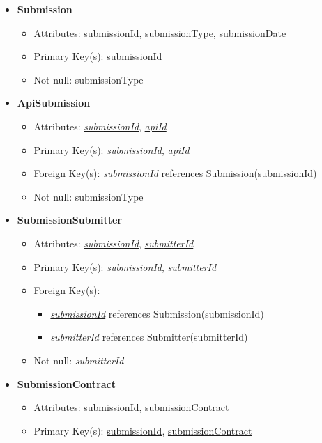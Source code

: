 \begin{itemize}
        \item \textbf{Submission}
        \begin{itemize}
            \item Attributes: \underline{submissionId}, submissionType, submissionDate
            \item Primary Key(s): \underline{submissionId}            
            \item Not null: submissionType
        \end{itemize}

        \item \textbf{ApiSubmission}
        \begin{itemize}
            \item Attributes: \underline{\textit{submissionId}}, \underline{\textit{apiId}}
            \item Primary Key(s): \underline{\textit{submissionId}}, \underline{\textit{apiId}}
            \item Foreign Key(s): \underline{\textit{submissionId}} references Submission(submissionId)
            \item Not null: submissionType
        \end{itemize}

        \item \textbf{SubmissionSubmitter}
        \begin{itemize}
            \item Attributes: \underline{\textit{submissionId}}, \underline{\textit{submitterId}}
            \item Primary Key(s): \underline{\textit{submissionId}}, \underline{\textit{submitterId}}
            \item Foreign Key(s): 
            \begin{itemize}
                \item \underline{\textit{submissionId}} references Submission(submissionId)
                \item \textit{submitterId} references Submitter(submitterId)
            \end{itemize}
            \item Not null: \textit{submitterId}
        \end{itemize}

        \item \textbf{SubmissionContract}
        \begin{itemize}
            \item Attributes: \underline{submissionId}, \underline{submissionContract}
            \item Primary Key(s): \underline{submissionId}, \underline{submissionContract}
        \end{itemize}


\end{itemize}
